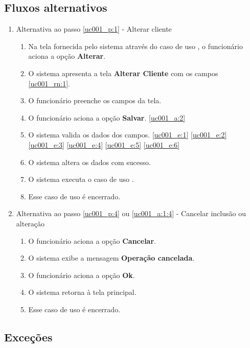 \subsection{Fluxos alternativos}

\begin{enumerate}[label=A\arabic*]
	\item Alternativa ao passo \ref{uc001_p:1} - Alterar cliente \label{uc001_a:1}
	\begin{enumerate}[label*=.\arabic*]
		\item Na tela fornecida pelo sistema através do caso de uso , o funcionário aciona a opção \textbf{Alterar}. 
		\item O sistema apresenta a tela \textbf{Alterar Cliente} com os campos \ref{uc001_rn:1}. \label{uc001_a:1:2}
		\item O funcionário preenche os campos da tela. \label{uc001_a:1:3}
		\item O funcionário aciona a opção \textbf{Salvar}. \label{uc001_a:1:4}\ref{uc001_a:2}
		\item O sistema valida os dados dos campos. \ref{uc001_e:1} \ref{uc001_e:2} \ref{uc001_e:3} \ref{uc001_e:4} \ref{uc001_e:5} \ref{uc001_e:6}
		\item O sistema altera os dados com sucesso.
		\item O sistema executa o caso de uso .
		\item Esse caso de uso é encerrado.
	\end{enumerate}

	\item Alternativa ao passo \ref{uc001_p:4} ou \ref{uc001_a:1:4} - Cancelar inclusão ou alteração \label{uc001_a:2}
	\begin{enumerate}[label*=.\arabic*]
		\item O funcionário aciona a opção \textbf{Cancelar}.
		\item O sistema exibe a mensagem \textbf{Operação cancelada}.
		\item O funcionário aciona a opção \textbf{Ok}.
		\item O sistema retorna à tela principal.
		\item Esse caso de uso é encerrado.
	\end{enumerate}			 	
\end{enumerate}

\subsection{Exceções}

